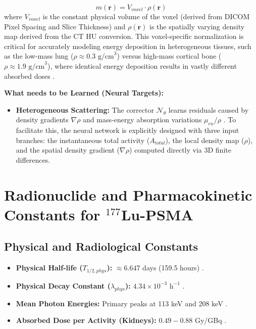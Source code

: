 \documentclass[11pt,a4paper]{article}
\begin{document}
\begin{itemize}
    \begin{equation}
        m(\mathbf{r}) = V_{voxel} \cdot \rho(\mathbf{r})
    \end{equation}
    where $V_{voxel}$ is the constant physical volume of the voxel (derived from DICOM Pixel Spacing and Slice Thickness) and $\rho(\mathbf{r})$ is the spatially varying density map derived from the CT HU conversion. This voxel-specific normalization is critical for accurately modeling energy deposition in heterogeneous tissues, such as the low-mass lung ($ \rho \approx 0.3 \text{ g/cm}^3$) versus high-mass cortical bone ($\rho \approx 1.9 \text{ g/cm}^3$), where identical energy deposition results in vastly different absorbed doses \cite{GtzSchmidkonz2019, StabinMadsen2019}.
\end{itemize}

\textbf{What needs to be Learned (Neural Targets):}
\begin{itemize}
    \item \textbf{Heterogeneous Scattering:} The corrector $\mathcal{N}_\theta$ learns residuals caused by density gradients $\nabla \rho$ and mass-energy absorption variations $\mu_{en}/\rho$ \cite{BaileyMarquis2022, MikellKappadath2016}. To facilitate this, the neural network is explicitly designed with three input branches: the instantaneous total activity ($A_{total}$), the local density map ($\rho$), and the spatial density gradient ($\nabla \rho$) computed directly via 3D finite differences.
\end{itemize}

\section{Radionuclide and Pharmacokinetic Constants for $^{177}$Lu-PSMA}

\subsection{Physical and Radiological Constants}
\begin{itemize}
    \item \textbf{Physical Half-life ($T_{1/2,phys}$):} $\approx 6.647$ days (159.5 hours) \cite{HardiansyahYousefzadehNowshahr2024}.
    \item \textbf{Physical Decay Constant ($\lambda_{phys}$):} $4.34 \times 10^{-3} \text{ h}^{-1}$ \cite{ReschFouladgar2023}.
    \item \textbf{Mean Photon Energies:} Primary peaks at 113 keV and 208 keV \cite{StabinMadsen2019}.
    \item \textbf{Absorbed Dose per Activity (Kidneys):} $0.49 - 0.88$ Gy/GBq \cite{ChuamsaamarkkeeCharoenphun2025, OkamotoThieme2016}.
\end{itemize}
\end{document}
